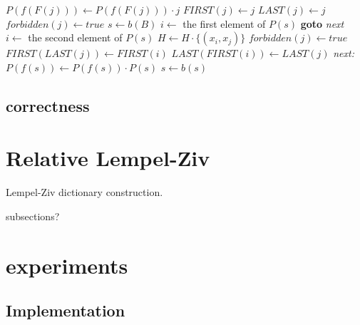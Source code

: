 \documentclass[english,twoside,censored,csm,algorithms-track-2020]{HYthesisML}
\theoremstyle{plain}
\theoremstyle{definition}
\begin{document}
\begin{lemma}[]
\begin{algorithm}
    \begin{algorithmic}[1]
            \State $P(f(F(j)))\gets P(f(F(j)))\cdot {j}$
            \State $FIRST(j)\gets j$
            \State $LAST(j)\gets j$
          \Else
            \State $forbidden(j)\gets true$
          \EndIf
        \EndFor  
        \State $s\gets b(B)$
              \State $i\gets$ the first element of $P(s)$
                  \hspace*{\algorithmicindent} \textbf{goto} \textit{next}
                \Else
                  \State $i\gets$ the second element of $P(s)$
                \EndIf
              \EndIf  
            \State $H\gets H\cdot \{(x_i,x_j)\}$
            \State $forbidden(j)\gets true$
            \State $FIRST(LAST(j))\gets FIRST(i)$
            \State $LAST(FIRST(i))\gets LAST(j)$
            \hspace*{\algorithmicindent} \textit{next:}
            \EndFor
          \State $P(f(s))\gets P(f(s))\cdot P(s)$
          \EndIf
          \State $s\gets b(s)$
        \EndWhile
      \EndFunction
    \end{algorithmic}
  \end{algorithm}
  


  \section{correctness}


\chapter{Relative Lempel-Ziv}

  Lempel-Ziv dictionary construction.

  subsections?

\chapter{experiments}

  \section{Implementation}


\end{lemma}
\end{document}
